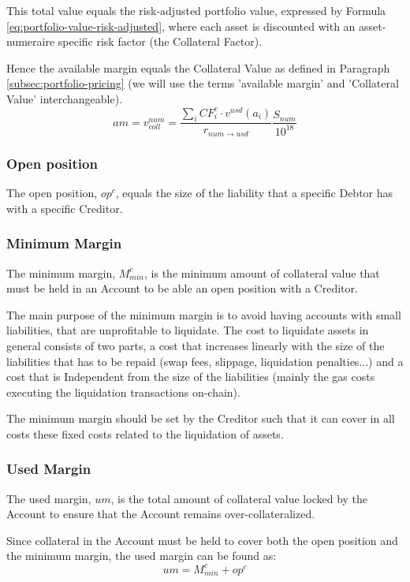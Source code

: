 \documentclass[sigconf,nonacm]{acmart}
\begin{document}
This total value equals the risk-adjusted portfolio value, expressed by Formula \ref{eq:portfolio-value-risk-adjusted},
where each asset is discounted with an asset-numeraire specific risk factor (the Collateral Factor).

Hence the available margin equals the Collateral Value as defined in Paragraph \ref{subsec:portfolio-pricing}
(we will use the terms 'available margin' and 'Collateral Value' interchangeable).
\begin{equation}
    \label{eq:available-margin}
    am = v_{coll}^{num} = \frac{\sum_{i}{CF_{i}^{c} \cdot v^{usd}(a_{i})}}{r_{num\rightarrow usd}}\frac{S_{num}}{10^{18}}
\end{equation}

\subsubsection{Open position}
The open position, $op^c$, equals the size of the liability that a specific Debtor has with a specific Creditor.

\subsubsection{Minimum Margin}
The minimum margin, $M_{min}^c$, is the minimum amount of collateral value that must be held in an Account to be able an open position with a Creditor.

The main purpose of the minimum margin is to avoid having accounts with small liabilities, that are unprofitable to liquidate.
The cost to liquidate assets in general consists of two parts, a cost that increases linearly with the size of the liabilities that has to be repaid (swap fees, slippage, liquidation penalties...)
and a cost that is Independent from the size of the liabilities (mainly the gas costs executing the liquidation transactions on-chain).

The minimum margin should be set by the Creditor such that it can cover in all costs these fixed costs related to the liquidation of assets.

\subsubsection{Used Margin}
The used margin, $um$, is the total amount of collateral value locked by the Account to ensure that the Account remains over-collateralized.

Since collateral in the Account must be held to cover both the open position and the minimum margin, the used margin can be found as:
\begin{equation}
    um = M_{min}^c + op^c
\end{equation}
\end{document}
